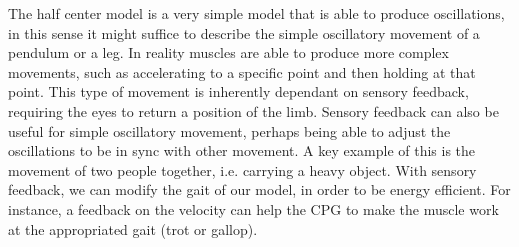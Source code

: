 \documentclass[11pt]{article}
\begin{document}
The half center model is a very simple model that is able to produce oscillations, in this sense it might suffice to describe the simple oscillatory movement of a pendulum or a leg. In reality muscles are able to produce more complex movements, such as accelerating to a specific point and then holding at that point. This type of movement is inherently dependant on sensory feedback, requiring the eyes to return a position of the limb. Sensory feedback can also be useful for simple oscillatory movement, perhaps being able to adjust the oscillations to be in sync with other movement. A key example of this is the movement of two people together, i.e. carrying a heavy object. With sensory feedback, we can modify the gait of our model, in order to be energy efficient. For instance, a feedback on the velocity can help the CPG to make the muscle work at the appropriated gait (trot or gallop).  
\end{document}
